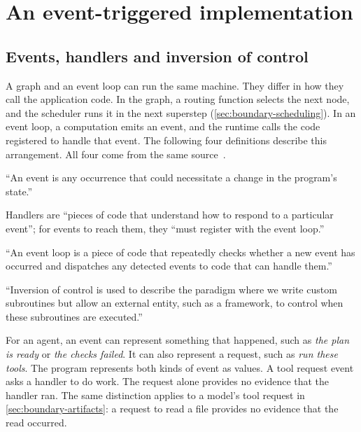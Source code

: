 \section{An event-triggered implementation}
\label{sec:events}

\subsection{Events, handlers and inversion of control}
\label{sec:events-ioc}

A graph and an event loop can run the same machine. They differ in how they call the application
code. In the graph, a routing function selects the next node, and the scheduler runs it in the next
superstep (\cref{sec:boundary-scheduling}). In an event loop, a computation emits an event, and the
runtime calls the code registered to handle that event. The following four definitions describe
this arrangement. All four come from the same source~\citep[Event Handling; Understanding the
Event Loop]{cornell-cs2110-lec25}.

\begin{definition}[Event]
\label{def:event}
``An event is any occurrence that could necessitate a change in the program's state.''
\end{definition}

\begin{definition}[Handler]
\label{def:handler}
Handlers are ``pieces of code that understand how to respond to a particular event''; for events to
reach them, they ``must register with the event loop.''
\end{definition}

\begin{definition}
\label{def:event-loop}
``An event loop is a piece of code that repeatedly checks whether a new event has occurred and
dispatches any detected events to code that can handle them.''
\end{definition}

\begin{definition}
\label{def:inversion-of-control}
``Inversion of control is used to describe the paradigm where we write custom subroutines but allow
an external entity, such as a framework, to control when these subroutines are executed.''
\end{definition}

For an agent, an event can represent something that happened, such as \emph{the plan is ready} or
\emph{the checks failed}. It can also represent a request, such as \emph{run these tools}. The
program represents both kinds of event as values. A tool request event asks a handler to do work.
The request alone provides no evidence that the handler ran. The same distinction applies to a
model's tool request in \cref{sec:boundary-artifacts}: a request to read a file provides no evidence
that the read occurred.

